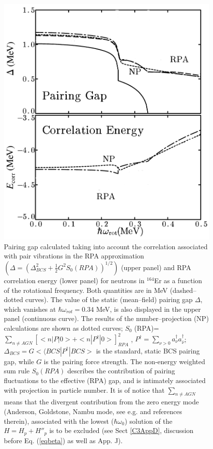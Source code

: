   \begin{figure}
  \centerline{\includegraphics*[width=\textwidth,angle=0]{nutshell/figs/fig1_1_2.pdf}}
  \caption{Pairing gap calculated taking into account the correlation associated with pair vibrations in the RPA approximation $(\Delta=(\Delta^2_{BCS}+\tfrac{1}{2}G^2S_0(RPA))^{1/2})$ (upper panel) and RPA correlation energy (lower panel) for neutrons in $^{164}$Er as a function of the rotational frequency. Both quantities are in MeV (dashed--dotted curves). The value of the static (mean--field) pairing gap $\Delta$, which vanishes at $\hbar \omega_{rot}=0.34 $ MeV, is also displayed in the upper panel (continuous curve). The results of the number--projection (NP) calculations are shown as dotted curves;  $S_0$ (RPA)= $\sum_{n \neq AGN} \left[<n|P |0>  + <n|P^{\dagger} |0>\right]^2_{RPA}$ , $P^\dagger=\sum_{\nu>0}a^\dagger_\nu a^\dagger_{\bar \nu}$; \mbox{$\Delta_{BCS} = G<⟨BCS|P^{\dagger}|BCS>$} is the standard, static BCS pairing gap,
    while $G$ is the pairing force strength. The non-energy weighted sum rule $S_0 (RPA)$
    describes the contribution of pairing fluctuations to the effective (RPA) gap,
    and is intimately associated with projection in particle number. It is of notice
    that $\sum_{n \neq AGN}$ means that the divergent contribution from the zero energy mode
    (Anderson, Goldstone, Nambu mode, see e.g. \cite{Broglia:00} and references therein), associated with the lowest ($\hbar \omega_0$) solution
    of the $H=H_{p}+H''_p$ is to be excluded (see Sect \ref{C3AppD}, discussion before Eq. (\ref{eqbeta}) as well as \cite{Brink:05} App. J).}\label{fig1.2}
  \end{figure}
  
